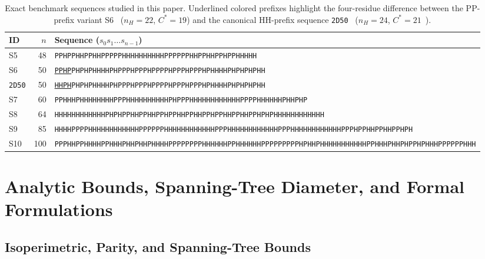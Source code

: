 \documentclass[11pt]{article}
\begin{document}
\begin{table}[t]
\centering
\caption{Exact benchmark sequences studied in this paper. Underlined colored prefixes highlight the four-residue difference between the PP-prefix variant S6~\cite[Table~1]{chen2005} ($n_H = 22$, $C^* = 19$) and the canonical HH-prefix sequence \texttt{2D50}~\cite{unger1993} ($n_H = 24$, $C^* = 21$~\cite{giaquinta2013}).}
\label{tab:seqs}
\scriptsize
\setlength{\tabcolsep}{3.5pt}
\begin{tabular}{@{}lrl@{}}
\toprule
\textbf{ID} & $n$ & \textbf{Sequence ($s_0 s_1 \dots s_{n-1}$)} \\
\midrule
S5 & 48 & \texttt{PPHPPHHPPHHPPPPPHHHHHHHHHHPPPPPPHHPPHHPPHPPHHHHH} \\
S6 & 50 & \texttt{\textcolor{blue!70!black}{\underline{PPHP}}PHPHPHHHHPHPPPHPPPHPPPPHPPPHPPPHPHHHHPHPHPHPHH} \\
\texttt{2D50} & 50 & \texttt{\textcolor{red!70!black}{\underline{HHPH}}PHPHPHHHHPHPPPHPPPHPPPPHPPPHPPPHPHHHHPHPHPHPHH} \\
S7 & 60 & \texttt{PPHHHPHHHHHHHHPPPHHHHHHHHHHPHPPPHHHHHHHHHHHHPPPPHHHHHHPHHPHP} \\
S8 & 64 & \texttt{HHHHHHHHHHHHPHPHPPHHPPHHPPHPPHHPPHHPPHPPHHPPHHPPHPHPHHHHHHHHHHHH} \\
S9 & 85 & \texttt{HHHHPPPPHHHHHHHHHHHHPPPPPPHHHHHHHHHHHHPPPHHHHHHHHHHHHPPPHHHHHHHHHHHHPPPHPPHHPPHHPPHPH} \\
S10 & 100 & \texttt{PPPHHPPHHHHPPHHHPHHPHHPHHHHPPPPPPPPHHHHHHPPHHHHHHPPPPPPPPPHPHHPHHHHHHHHHHHPPHHHPHHPHPPHPHHHPPPPPPHHH} \\
\bottomrule
\end{tabular}
\end{table}

\section{Analytic Bounds, Spanning-Tree Diameter, and Formal Formulations}\label{sec:methods}

\subsection{Isoperimetric, Parity, and Spanning-Tree Bounds}\label{sec:bounds}
\end{document}
